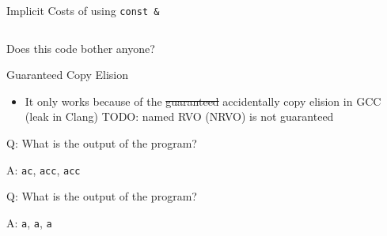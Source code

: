 \documentclass[compress,aspectratio=1610]{beamer}
\newcommand{\inputcpplisting}[1]{}
\newcommand{\inputasmlisting}[1]{}
\begin{document}
\begin{frame}[fragile]{Implicit Costs of using \texttt{const \&}}
    \begin{columns}[t]
        \begin{column}{.45\textwidth}
            \inputasmlisting{snippet1b}
        \end{column}
        \begin{column}{.45\textwidth}
            \inputasmlisting{snippet2b}
        \end{column}
    \end{columns}
\end{frame}

\begin{frame}[fragile]
    \inputcpplisting{snippet8}
\end{frame}

\begin{frame}[fragile]{Does this code bother anyone?}
    \inputcpplisting{snippet3}
\end{frame}

\begin{frame}{Guaranteed Copy Elision}
    \begin{itemize}
        \item It only works because of the \st{guaranteed} accidentally copy elision in GCC (leak in Clang) TODO: named RVO (NRVO) is not guaranteed
    \end{itemize}
\end{frame}

\begin{frame}[fragile]{Q: What is the output of the program?}
    \inputcpplisting{snippet4a}
\end{frame}

\begin{frame}[fragile]{A: \texttt{ac}, \texttt{acc}, \texttt{acc}}
    \inputcpplisting{snippet4a}
\end{frame}

\begin{frame}[fragile]{Q: What is the output of the program?}
    \inputcpplisting{snippet4b}
\end{frame}

\begin{frame}[fragile]{A: \texttt{a}, \texttt{a}, \texttt{a}}
    \inputcpplisting{snippet4b}
\end{frame}
\end{document}
